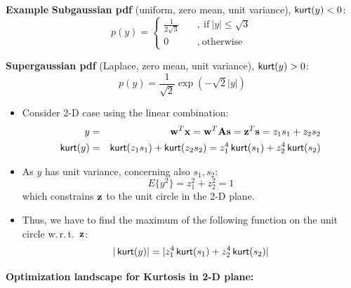\textbf{Example}
        \textbf{\small \hspace{.5cm} Subgaussian pdf} (uniform, zero mean, unit variance), $\mathop{\mathsf{kurt}}(y)<0$:
        \begin{displaymath}
          p(y) = \begin{cases}
                   \frac{1}{2\sqrt{3}} \quad &, ~\mbox{if}~|y| \leq \sqrt{3} \\
                   0 \quad &, ~\mbox{otherwise}
                 \end{cases}
        \end{displaymath}
      
       \textbf  {\small \hspace{.5cm} Supergaussian pdf} (Laplace, zero mean, unit variance), $\mathop{\mathsf{kurt}}(y)>0$:
        {\footnotesize
        \begin{displaymath}
          p(y) = \frac{1}{\sqrt{2}} \exp(-\sqrt{2} |y|)
        \end{displaymath}
        }
   
  \begin{itemize}
    \item Consider 2-D case using the linear combination:
      \begin{eqnarray*}
        y        &=& \bm{\mathrm{w}}^T \bm{\mathrm{x}} = \bm{\mathrm{w}}^T \mathbf{A} \bm{\mathrm{s}} = \bm{\mathrm{z}}^T \bm{\mathrm{s}} = z_1 s_1 + z_2 s_2 \\
        \mathop{\mathsf{kurt}}(y) &=& \mathop{\mathsf{kurt}}(z_1 s_1) + \mathop{\mathsf{kurt}}(z_2 s_2) = z_1^4 \mathop{\mathsf{kurt}}(s_1) + z_2^4 \mathop{\mathsf{kurt}}(s_2)            
      \end{eqnarray*}
    \item As $y$ has unit variance, concerning also $s_1, s_2$:
      \begin{displaymath}
        E\{ y^2 \} = z_1^2 + z_2^2 = 1
      \end{displaymath}
      which constrains $\bm{\mathrm{z}}$ to the unit circle in the 2-D plane.                     
    \item Thus, we have to find the maximum of the following function on the unit circle w.\,r.\,t.\ $\bm{\mathrm{z}}$:
      \begin{displaymath}
        | \mathop{\mathsf{kurt}}(y) | = | z_1^4 \mathop{\mathsf{kurt}}(s_1) + z_2^4 \mathop{\mathsf{kurt}}(s_2) |
      \end{displaymath}
  \end{itemize}
 
 \textbf {Optimization landscape for Kurtosis in 2-D plane:}

